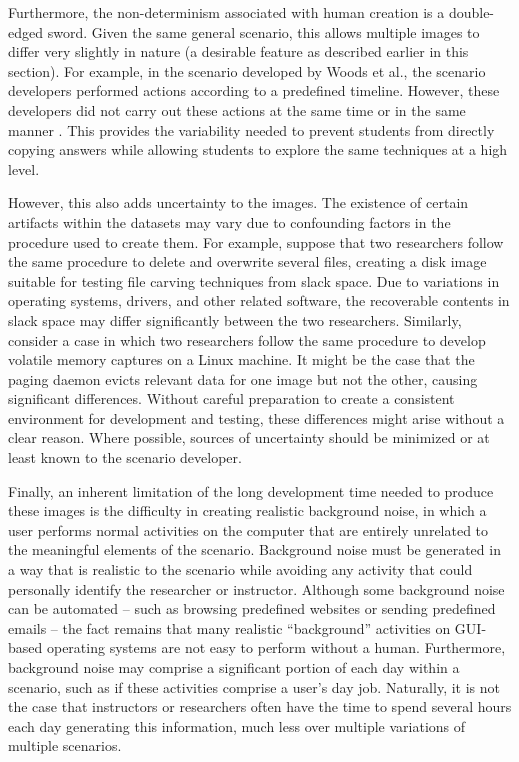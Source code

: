 \documentclass[letterpaper,12pt]{report}
\begin{document}
Furthermore, the non-determinism associated with human creation is a
double-edged sword. Given the same general scenario, this allows
multiple images to differ very slightly in nature (a desirable feature
as described earlier in this section). For example, in the scenario
developed by Woods et al., the scenario developers performed actions
according to a predefined timeline. However, these developers did not
carry out these actions at the same time or in the same manner
\cite{woodsCreatingRealisticCorpora2011}. This provides the
variability needed to prevent students from directly copying answers
while allowing students to explore the same techniques at a high level.

However, this also adds uncertainty to the images. The existence of
certain artifacts within the datasets may vary due to confounding
factors in the procedure used to create them. For example, suppose that
two researchers follow the same procedure to delete and overwrite
several files, creating a disk image suitable for testing file carving
techniques from slack space. Due to variations in operating systems,
drivers, and other related software, the recoverable contents in slack
space may differ significantly between the two researchers. Similarly,
consider a case in which two researchers follow the same procedure to
develop volatile memory captures on a Linux machine. It might be the
case that the paging daemon evicts relevant data for one image but not
the other, causing significant differences. Without careful preparation
to create a consistent environment for development and testing, these
differences might arise without a clear reason. Where possible, sources
of uncertainty should be minimized or at least known to the scenario
developer.

Finally, an inherent limitation of the long development time needed to
produce these images is the difficulty in creating realistic background
noise, in which a user performs normal activities on the computer that
are entirely unrelated to the meaningful elements of the scenario.
Background noise must be generated in a way that is realistic to the
scenario while avoiding any activity that could personally identify the
researcher or instructor. Although some background noise can be
automated -- such as browsing predefined websites or sending predefined
emails -- the fact remains that many realistic ``background'' activities
on GUI-based operating systems are not easy to perform without a human.
Furthermore, background noise may comprise a significant portion of each
day within a scenario, such as if these activities comprise a user's day
job. Naturally, it is not the case that instructors or researchers often
have the time to spend several hours each day generating this
information, much less over multiple variations of multiple scenarios.
\end{document}
